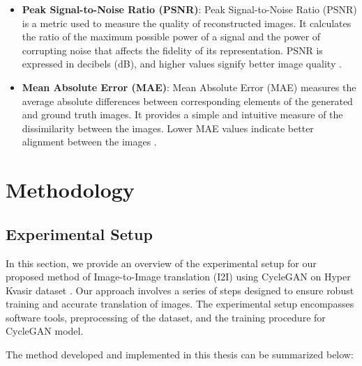 \documentclass[UKenglish,12pt]{master-style}
\begin{document}
\begin{itemize}
\item \textbf{Peak Signal-to-Noise Ratio (PSNR)}:
Peak Signal-to-Noise Ratio (PSNR) is a metric used to measure the quality of reconstructed images. It calculates the ratio of the maximum possible power of a signal and the power of corrupting noise that affects the fidelity of its representation. PSNR is expressed in decibels (dB), and higher values signify better image quality\cite{evaluation}  .

\item \textbf{Mean Absolute Error (MAE)}:
Mean Absolute Error (MAE) measures the average absolute differences between corresponding elements of the generated and ground truth images. It provides a simple and intuitive measure of the dissimilarity between the images. Lower MAE values indicate better alignment between the images \cite{evaluation} .

\end{itemize}

\chapter{Methodology}
\section{Experimental Setup}
In this section, we provide an overview of the experimental setup for our proposed method of Image-to-Image translation (I2I) using CycleGAN  \cite{CycleGAN} on Hyper Kvasir dataset \cite{HyperKvasir_Dataset}. Our approach involves a series of steps designed to ensure robust training and accurate translation of images. The experimental setup encompasses software tools, preprocessing of the dataset, and the training procedure for CycleGAN model.

The method developed and implemented in this thesis can be summarized below:
\end{document}
